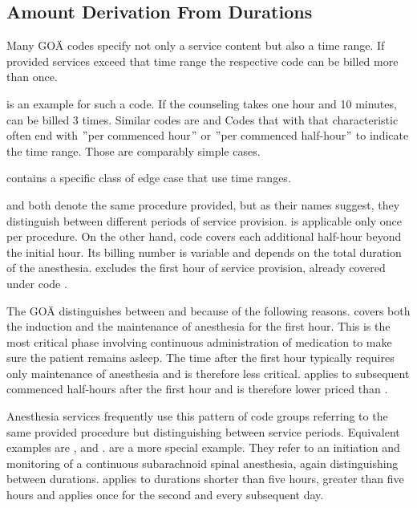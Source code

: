 \subsection{Amount Derivation From Durations}\label{subsec:amount-derivation-from-durations}

Many GOÄ codes specify not only a service content but also a time range.
If provided services exceed that time range the respective code can be billed more than once.

 is an example for such a code.
If the counseling takes one hour and 10 minutes,  can be billed 3 times.
Similar codes are 
and 
Codes that with that characteristic often end with \("\)per commenced hour\("\) or \("\)per commenced half-hour\("\) to indicate the time range.
Those are comparably simple cases.

 contains a specific class of edge case that use time ranges.

 and 
both denote the same procedure provided, but as their names suggest, they distinguish between different periods of service provision.
 is applicable only once per procedure.
On the other hand, code  covers each additional half-hour beyond the initial hour.
Its billing number is variable and depends on the total duration of the anesthesia.
 excludes the first hour of service provision, already covered under code .

The GOÄ distinguishes between  and  because of the following reasons.
 covers both the induction and the maintenance of anesthesia for the first hour.
This is the most critical phase involving continuous administration of medication to make sure the patient remains asleep.
The time after the first hour typically requires only maintenance of anesthesia and is therefore less critical.
 applies to subsequent commenced half-hours after the first hour and is therefore lower priced than .


Anesthesia services frequently use this pattern of code groups referring to the same provided procedure but distinguishing between service periods.
Equivalent examples are ,  and .
 are a more special example.
They refer to an initiation and monitoring of a continuous subarachnoid spinal anesthesia, again distinguishing between durations.
 applies to durations shorter than five hours,  greater than five hours and  applies once for the second and every subsequent day.

